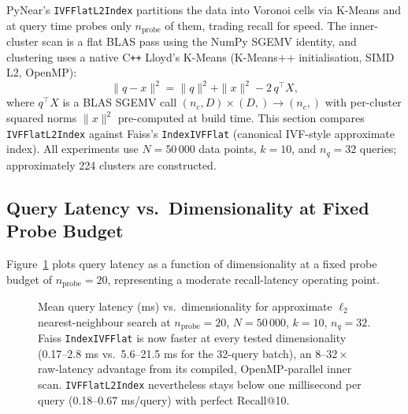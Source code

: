\documentclass[11pt,a4paper]{article}
\begin{document}
PyNear's \texttt{IVFFlatL2Index} partitions the data into Voronoi cells via
K-Means and at query time probes only $n_{\mathrm{probe}}$ of them, trading
recall for speed.  The inner-cluster scan is a flat BLAS pass using the
NumPy SGEMV identity, and clustering uses a native C\texttt{++} Lloyd's
K-Means (K-Means++ initialisation, SIMD L2, OpenMP):
\[
  \|q - x\|^2 = \|q\|^2 + \|x\|^2 - 2\,q^\top X,
\]
where $q^\top X$ is a BLAS SGEMV call $(n_c, D) \times (D,) \to (n_c,)$
with per-cluster squared norms $\|x\|^2$ pre-computed at build time.
This section compares \texttt{IVFFlatL2Index} against Faiss's
\texttt{IndexIVFFlat} (canonical IVF-style approximate index).
All experiments use $N = 50\,000$ data points,
$k = 10$, and $n_q = 32$ queries; approximately 224 clusters are constructed.

\subsection{Query Latency vs.\ Dimensionality at Fixed Probe Budget}
\label{sec:approx-dim}

Figure~\ref{fig:approx-time} plots query latency as a function of
dimensionality at a fixed probe budget of $n_{\mathrm{probe}} = 20$,
representing a moderate recall-latency operating point.

\begin{figure}[h]
\centering
{}
\caption{Mean query latency (ms) vs.\ dimensionality for approximate
  $\ell_2$ nearest-neighbour search at $n_{\mathrm{probe}} = 20$,
  $N = 50\,000$, $k=10$, $n_q=32$.
  Faiss \texttt{IndexIVFFlat} is now faster at every tested
  dimensionality (0.17--2.8 ms vs.\ 5.6--21.5 ms for the 32-query batch),
  an $8\text{--}32\times$ raw-latency advantage from its compiled,
  OpenMP-parallel inner scan.  \texttt{IVFFlatL2Index} nevertheless stays
  below one millisecond per query (0.18--0.67 ms/query) with
  perfect Recall@10.}
\label{fig:approx-time}
\end{figure}
\end{document}
